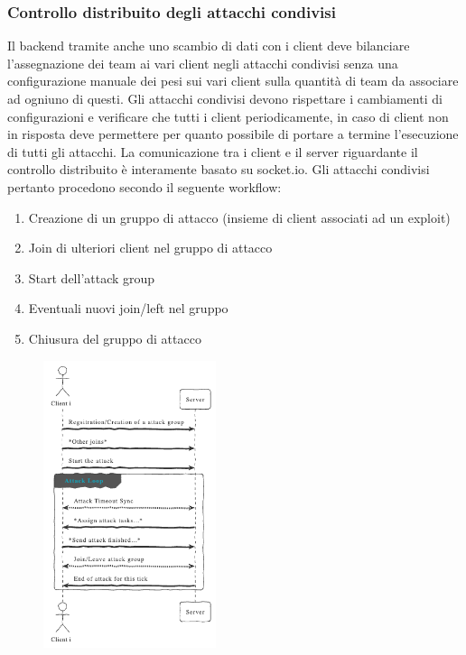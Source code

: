 \documentclass[11pt]{article}
\begin{document}
\subsubsection{Controllo distribuito degli attacchi condivisi}
Il backend tramite anche uno scambio di dati con i client deve bilanciare l'assegnazione dei team ai vari client negli attacchi condivisi senza una configurazione manuale dei pesi sui vari client sulla quantità di team da associare ad ogniuno di questi. Gli attacchi condivisi devono rispettare i cambiamenti di configurazioni e verificare che tutti i client periodicamente, in caso di client non in risposta deve permettere per quanto possibile di portare a termine l'esecuzione di tutti gli attacchi.
La comunicazione tra i client e il server riguardante il controllo distribuito è interamente basato su socket.io.
Gli attacchi condivisi pertanto procedono secondo il seguente workflow:
\begin{enumerate}
	\item Creazione di un gruppo di attacco (insieme di client associati ad un exploit)
	\item Join di ulteriori client nel gruppo di attacco
	\item Start dell'attack group
	\item Eventuali nuovi join/left nel gruppo
	\item Chiusura del gruppo di attacco
\end{enumerate}
\begin{figure}[H]
	\centering
	\includegraphics[width=0.45\textwidth]{shared_attack_sequence.png}
\end{figure}
\end{document}

